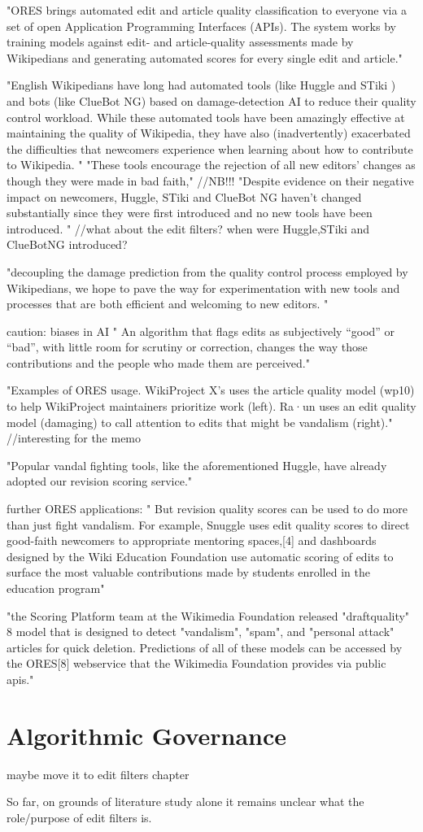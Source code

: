 "ORES brings automated edit and article quality classification to everyone via a set of open Application Programming Interfaces (APIs). The system works by training models against edit- and article-quality assessments made by Wikipedians and generating automated scores for every single edit and article."

"English Wikipedians have long had automated tools (like Huggle and STiki ) and bots (like ClueBot NG) based on damage-detection AI to reduce their quality control workload.  While these automated tools have been amazingly effective at maintaining the quality of Wikipedia, they have also (inadvertently) exacerbated the difficulties that newcomers experience when learning about how to contribute to Wikipedia. "
"These tools encourage the rejection of all new editors’ changes as though they were made in bad faith," //NB!!!
"Despite evidence on their negative impact on newcomers, Huggle, STiki and ClueBot NG haven’t changed substantially since they were first introduced and no new tools have been introduced. " //what about the edit filters? when were Huggle,STiki and ClueBotNG introduced?

"decoupling the damage prediction from the quality control process employed by Wikipedians, we hope to pave the way for experimentation with new tools and processes that are both efficient and welcoming to new editors. "

caution: biases in AI
" An algorithm that flags edits as subjectively “good” or “bad”, with little room for scrutiny or correction, changes the way those contributions and the people who made them are perceived."

"Examples of ORES usage. WikiProject X’s uses the article quality model (wp10) to help WikiProject maintainers prioritize work (left). Ra·un uses an edit quality model (damaging) to call attention to edits that might be vandalism (right)." //interesting for the memo

"Popular vandal fighting tools, like the aforementioned Huggle, have already adopted our revision scoring service."

further ORES applications:
"  But revision quality scores can be used to do more than just fight vandalism. For example, Snuggle uses edit quality scores to direct good-faith newcomers to appropriate mentoring spaces,[4] and dashboards designed by the Wiki Education Foundation use automatic scoring of edits to surface the most valuable contributions made by students enrolled in the education program"


\cite{AstHal2018}
"the Scoring Platform team at the Wikimedia Foundation
released "draftquality" 8 model that is designed to detect "vandalism", "spam", and "personal attack"
articles for quick deletion. Predictions of all of these models can be accessed by the ORES[8]
webservice that the Wikimedia Foundation provides via public apis."
\section{Algorithmic Governance}

maybe move it to edit filters chapter


So far, on grounds of literature study alone it remains unclear what the role/purpose of edit filters is.
